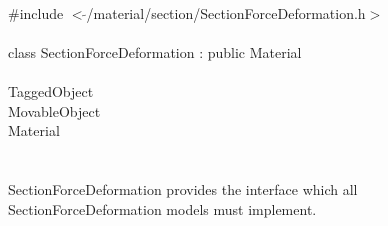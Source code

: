 
   \\
\indent \#include $<\tilde{ }$/material/section/SectionForceDeformation.h$>$  \\

  \\
\indent class SectionForceDeformation : public Material \\

 \\
\indent TaggedObject \\
\indent MovableObject \\
\indent\indent Material \\
\indent\indent{} \\

  \\
\indent SectionForceDeformation provides the interface which all
SectionForceDeformation models must implement. \\

